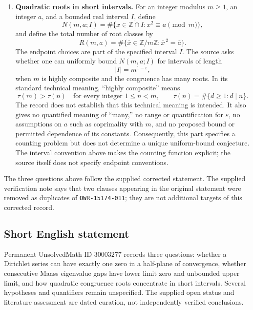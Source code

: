 \documentclass[11pt]{article}
\newcommand{\Z}{\mathbb{Z}}
\begin{document}
\begin{enumerate}
\item \textbf{Quadratic roots in short intervals.} For an integer modulus \(m\geq1\), an integer \(a\), and a bounded real interval \(I\), define
\[
N(m,a;I)=\#\{x\in\Z\cap I:x^2\equiv a\pmod m\},
\]
and define the total number of root classes by
\[
R(m,a)=\#\{\bar x\in\Z/m\Z:\bar x^{\,2}=\bar a\}.
\]
The endpoint choices are part of the specified interval \(I\). The source asks whether one can uniformly bound \(N(m,a;I)\) for intervals of length
\[
|I|=m^{1-\varepsilon},
\]
when \(m\) is highly composite and the congruence has many roots. In its standard technical meaning, ``highly composite'' means
\[
\tau(m)>\tau(n)\quad\text{for every integer }1\leq n<m,
\qquad
\tau(n)=\#\{d\geq1:d\mid n\}.
\]
The record does not establish that this technical meaning is intended. It also gives no quantified meaning of ``many,'' no range or quantification for \(\varepsilon\), no assumptions on \(a\) such as coprimality with \(m\), and no proposed bound or permitted dependence of its constants. Consequently, this part specifies a counting problem but does not determine a unique uniform-bound conjecture. The interval convention above makes the counting function explicit; the source itself does not specify endpoint conventions.
\end{enumerate}

The three questions above follow the supplied corrected statement. The supplied verification note says that two clauses appearing in the original statement were removed as duplicates of \texttt{OWR-15174-011}; they are not additional targets of this corrected record.
\subsection{Short English statement}
Permanent UnsolvedMath ID \(30003277\) records three questions: whether a Dirichlet series can have exactly one zero in a half-plane of convergence, whether consecutive Maass eigenvalue gaps have lower limit zero and unbounded upper limit, and how quadratic congruence roots concentrate in short intervals. Several hypotheses and quantifiers remain unspecified. The supplied open status and literature assessment are dated curation, not independently verified conclusions.
\end{document}
